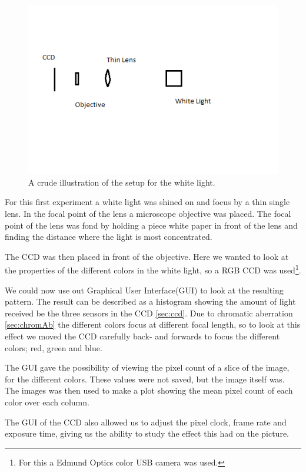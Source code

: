 \documentclass{emulateapj}
\begin{document}
\begin{figure}[H]
\centering
\includegraphics[scale=0.4]{setupLight.png}
\caption{A crude illustration of the setup for the white light.}
\end{figure}

For this first experiment a white light was shined on and focus by a thin single lens. In the focal point of the lens a microscope objective was placed. The focal point of the lens was fond by holding a piece white paper in front of the lens and finding the distance where the light is most concentrated. 

The CCD was then placed in front of the objective. Here we wanted to look at the properties of the different colors in the white light, so a RGB CCD was used\footnote{For this a Edmund Optics color USB camera was used.}. 

We could now use out Graphical User Interface(GUI) to look at the resulting pattern. The result can be described as a histogram showing the amount of light received be the three sensors in the CCD \ref{sec:ccd}. Due to chromatic aberration \ref{sec:chromAb} the different colors focus at different focal length, so to look at this effect we moved the CCD carefully back- and forwards to focus the different colors; red, green and blue.

The GUI gave the possibility of viewing the pixel count of a slice of the image, for the different colors. These values were not saved, but the image itself was. The images was then used to make a plot showing the mean pixel count of each color over each column.

The GUI of the CCD also allowed us to adjust the pixel clock, frame rate and exposure time, giving us the ability to study the effect this had on the picture.
\end{document}
